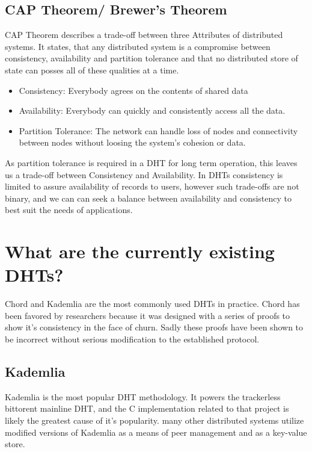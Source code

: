 \subsection{CAP Theorem/ Brewer’s Theorem}
CAP Theorem describes a trade-off between three Attributes of distributed systems.
It states, that any distributed system is a compromise between consistency, availability and partition tolerance and that no distributed store of state can posses all of these qualities at a time.
\begin{itemize}
\item Consistency: Everybody agrees on the contents of shared data
\item Availability: Everybody can quickly and consistently access all the data.
\item Partition Tolerance: The network can handle loss of nodes and connectivity between nodes without loosing the system's cohesion or data.
\end{itemize}

As partition tolerance is required in a DHT for long term operation, this leaves us a trade-off between Consistency and Availability.
In DHTs consistency is limited to assure availability of records to users, however such trade-offs are not binary, and we can can seek a balance between availability and consistency to best suit the needs of applications.


\section{What are the currently existing DHTs?}

Chord and Kademlia are the most commonly used DHTs in practice. 
Chord has been favored by researchers because it was designed with a series of proofs to show it's consistency in the face of churn.
Sadly these proofs have been shown to be incorrect\cite{} without serious modification to the established protocol.

\subsection{Kademlia}

Kademlia is the most popular DHT methodology. 
It powers the trackerless bittorent mainline DHT, and the C implementation related to that project is likely the greatest cause of it's popularity.
many other distributed systems utilize modified versions of Kademlia as a means of peer management and as a key-value store.

